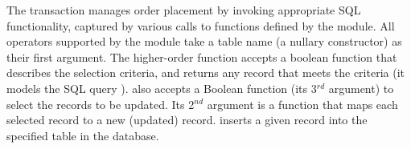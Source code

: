 The transaction manages order placement by invoking appropriate SQL
functionality, captured by various calls to functions defined by the
 module. All  operators supported by the module take a
table name (a nullary constructor) as their first argument. The
higher-order  function accepts a boolean function that
describes the selection criteria, and returns any record that meets
the criteria (it models the SQL query \C{SELECT \ldots\xspace LIMIT
  1}).  also accepts a Boolean function (its 3$^{rd}$
argument) to select the records to be updated. Its 2$^{nd}$ argument
is a function that maps each selected record to a new (updated)
record.  inserts a given record into the specified table
in the database.



